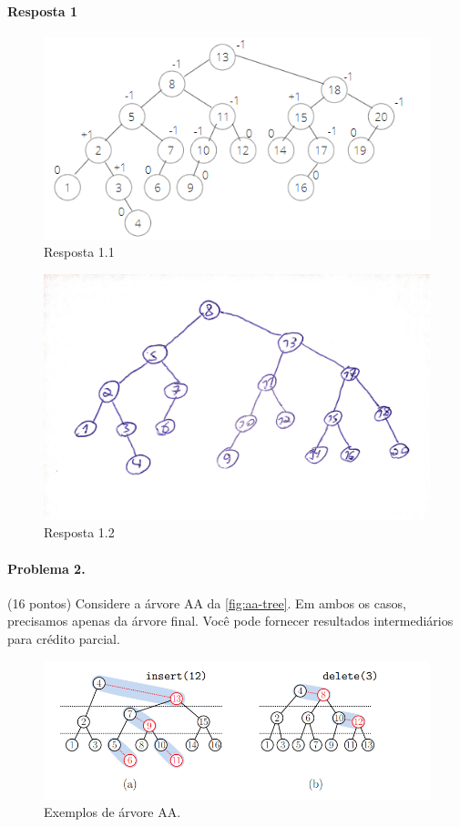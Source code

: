 \documentclass{article}
\begin{document}
\paragraph{Resposta 1}
 \begin{figure}[!h]
    \centering
    \includegraphics[width = 0.7\linewidth]{figures/img1.png}
    \caption{Resposta 1.1}
    \label{fig:aa-tree}
\end{figure}

 \begin{figure}[!h]
    \centering
    \includegraphics[width = 0.7\linewidth]{figures/img2.png}
    \caption{Resposta 1.2}
    \label{fig:aa-tree}
\end{figure}
\clearpage

\paragraph{Problema 2.} (16 pontos)
Considere a árvore AA da \autoref{fig:aa-tree}. Em ambos os casos, precisamos apenas da árvore final. Você pode fornecer resultados intermediários para crédito parcial.

\begin{figure}[h]
    \centering
    \includegraphics[width = 0.7\linewidth]{figures/fig-2.png}
    \caption{Exemplos de árvore AA.}
    \label{fig:aa-tree}
\end{figure}
\end{document}
